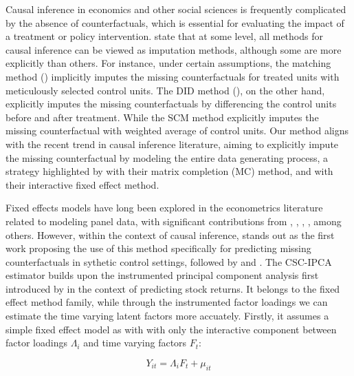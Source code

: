 \documentclass[12pt]{article}
\begin{document}
Causal inference in economics and other social sciences is frequently complicated by the absence of counterfactuals, which is essential for evaluating the impact of a treatment or policy intervention. \cite{imbens2015causal} state that at some level, all methods for causal inference can be viewed as imputation methods, although some are more explicitly than others. For instance, under certain assumptions, the matching method (\cite{abadie2006large, abadie2011bias}) implicitly imputes the missing counterfactuals for treated units with meticulously selected control units. The DID method (\cite{card1993minimum, ashenfelter1978estimating}), on the other hand, explicitly imputes the missing counterfactuals by differencing the control units before and after treatment. While the SCM method explicitly imputes the missing counterfactual with weighted average of control units. Our method aligns with the recent trend in causal inference literature, aiming to explicitly impute the missing counterfactual by modeling the entire data generating process, a strategy highlighted by \cite{athey2021matrix} with their matrix completion (MC) method, and \cite{xu2017generalized} with their interactive fixed effect method.

Fixed effects models have long been explored in the econometrics literature related to modeling panel data, with significant contributions from \cite{bai2003computation}, \cite{pesaran2006estimation}, \cite{stock2002forecasting}, \cite{eberhardt2009cross}, among others. However, within the context of causal inference, \cite{hsiao2012panel} stands out as the first work proposing the use of this method specifically for predicting missing counterfactuals in sythetic control settings, followed by \cite{gobillon2016regional, xu2017generalized, chan2016policy} and \cite{li2018inference}. The CSC-IPCA estimator builds upon the instrumented principal component analysis first introduced by \cite{kelly2020instrumented, kelly2019characteristics} in the context of predicting stock returns. It belongs to the fixed effect method family, while through the instrumented factor loadings we can estimate the time varying latent factors more accuately. Firstly, it assumes a simple fixed effect model as with \cite{bai2003computation} with only the interactive component between factor loadings $\Lambda_i$ and time varying factors $F_t$:

\begin{equation}
\label{eqn: static}
    Y_{it} = \Lambda_i F_t + \mu_{it}
\end{equation}
\end{document}

